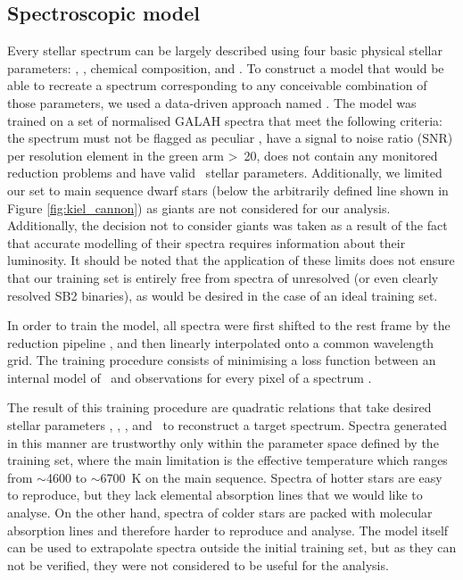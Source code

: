 \subsection{Spectroscopic model}
\label{sec:s_model}
Every stellar spectrum can be largely described using four basic physical stellar parameters: \Teff, \Logg, chemical composition, and \vsin. To construct a model that would be able to recreate a spectrum corresponding to any conceivable combination of those parameters, we used a data-driven approach named \TC. The model was trained on a set of normalised GALAH spectra that meet the following criteria: the spectrum must not be flagged as peculiar \cite{2017ApJS..228...24T}, have a signal to noise ratio (SNR) per resolution element in the green arm >~20, does not contain any monitored reduction problems and have valid \TC\ stellar parameters. Additionally, we limited our set to main sequence dwarf stars (below the arbitrarily defined line shown in Figure \ref{fig:kiel_cannon}) as giants are not considered for our analysis. Additionally, the decision not to consider giants was taken as a result of the fact that accurate modelling of their spectra requires information about their luminosity. It should be noted that the application of these limits does not ensure that our training set is entirely free from spectra of unresolved (or even clearly resolved SB2 binaries), as would be desired in the case of an ideal training set.

In order to train the model, all spectra were first shifted to the rest frame by the reduction pipeline \cite{2017MNRAS.464.1259K}, and then linearly interpolated onto a common wavelength grid. The training procedure consists of minimising a loss function between an internal model of \TC\ and observations for every pixel of a spectrum \cite{2015ApJ...808...16N}.

The result of this training procedure are quadratic relations that take desired stellar parameters \Teff, \Logg, \Feh, and \vsin\ to reconstruct a target spectrum. Spectra generated in this manner are trustworthy only within the parameter space defined by the training set, where the main limitation is the effective temperature which ranges from $\sim$4600 to $\sim$6700~K on the main sequence. Spectra of hotter stars are easy to reproduce, but they lack elemental absorption lines that we would like to analyse. On the other hand, spectra of colder stars are packed with molecular absorption lines and therefore harder to reproduce and analyse. The model itself can be used to extrapolate spectra outside the initial training set, but as they can not be verified, they were not considered to be useful for the analysis.

